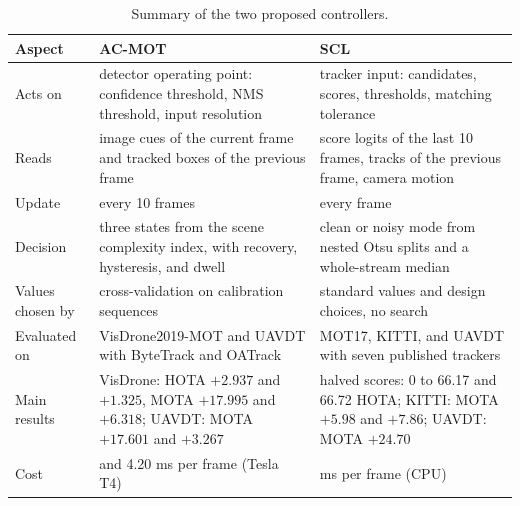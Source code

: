 \begin{table}[tbp]
\centering
\caption{Summary of the two proposed controllers.}
\label{tab:res-summary}
\begin{tabular}{>{\raggedright\arraybackslash}p{2.8cm}>{\raggedright\arraybackslash}p{5.8cm}>{\raggedright\arraybackslash}p{5.8cm}}
\toprule
Aspect & AC-MOT & SCL\\
\midrule
Acts on & detector operating point: confidence threshold, NMS threshold, input resolution & tracker input: candidates, scores, thresholds, matching tolerance\\
Reads & image cues of the current frame and tracked boxes of the previous frame & score logits of the last 10 frames, tracks of the previous frame, camera motion\\
Update & every 10 frames & every frame\\
Decision & three states from the scene complexity index, with recovery, hysteresis, and dwell & clean or noisy mode from nested Otsu splits and a whole-stream median\\
Values chosen by & cross-validation on calibration sequences & standard values and design choices, no search\\
Evaluated on & VisDrone2019-MOT and UAVDT with ByteTrack and OATrack & MOT17, KITTI, and UAVDT with seven published trackers\\
Main results & VisDrone: HOTA $+2.937$ and $+1.325$, MOTA $+17.995$ and $+6.318$; UAVDT: MOTA $+17.601$ and $+3.267$ & halved scores: 0 to 66.17 and 66.72 HOTA; KITTI: MOTA $+5.98$ and $+7.86$; UAVDT: MOTA $+24.70$\\
Cost & 4.26 and 4.20 ms per frame (Tesla T4) & 2.95 ms per frame (CPU)\\
\bottomrule
\end{tabular}
\end{table}
